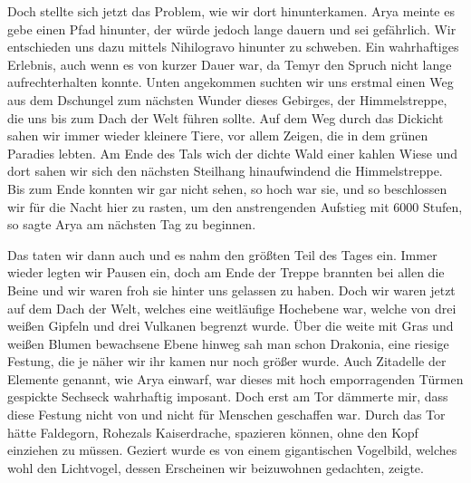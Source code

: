 Doch stellte sich jetzt das Problem, wie wir dort hinunterkamen. Arya meinte es gebe einen Pfad hinunter, der würde jedoch lange dauern und sei gefährlich. Wir entschieden uns dazu mittels Nihilogravo hinunter zu schweben. Ein wahrhaftiges Erlebnis, auch wenn es von kurzer Dauer war, da Temyr den Spruch nicht lange aufrechterhalten konnte. Unten angekommen suchten wir uns erstmal einen Weg aus dem Dschungel zum nächsten Wunder dieses Gebirges, der Himmelstreppe, die uns bis zum Dach der Welt führen sollte. Auf dem Weg durch das Dickicht sahen wir immer wieder kleinere Tiere, vor allem Zeigen, die in dem grünen Paradies lebten. Am Ende des Tals wich der dichte Wald einer kahlen Wiese und dort sahen wir sich den nächsten Steilhang hinaufwindend die Himmelstreppe. Bis zum Ende konnten wir gar nicht sehen, so hoch war sie, und so beschlossen wir für die Nacht hier zu rasten, um den anstrengenden Aufstieg mit 6000 Stufen, so sagte Arya am nächsten Tag zu beginnen.

Das taten wir dann auch und es nahm den größten Teil des Tages ein. Immer wieder legten wir Pausen ein, doch am Ende der Treppe brannten bei allen die Beine und wir waren froh sie hinter uns gelassen zu haben. Doch wir waren jetzt auf dem Dach der Welt, welches eine weitläufige Hochebene war, welche von drei weißen Gipfeln und drei Vulkanen begrenzt wurde. Über die weite mit Gras und weißen Blumen bewachsene Ebene hinweg sah man schon Drakonia, eine riesige Festung, die je näher wir ihr kamen nur noch größer wurde. Auch Zitadelle der Elemente genannt, wie Arya einwarf, war dieses mit hoch emporragenden Türmen gespickte Sechseck wahrhaftig imposant. Doch erst am Tor dämmerte mir, dass diese Festung nicht von und nicht für Menschen geschaffen war. Durch das Tor hätte Faldegorn, Rohezals Kaiserdrache, spazieren können, ohne den Kopf einziehen zu müssen. Geziert wurde es von einem gigantischen Vogelbild, welches wohl den Lichtvogel, dessen Erscheinen wir beizuwohnen gedachten, zeigte. 

